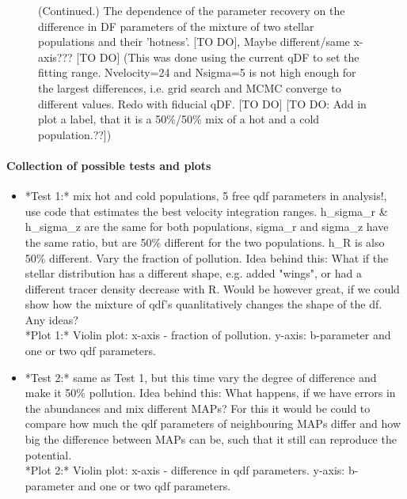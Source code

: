 \addtocounter{figure}{-1}
\begin{figure} [t!]
  \caption{(Continued.) The dependence of the parameter recovery on the difference in DF parameters of the mixture of two stellar populations and their 'hotness'.  [TO DO], Maybe different/same x-axis??? [TO DO] (This was done using the current qDF to set the fitting range. Nvelocity=24 and Nsigma=5 is not high enough for the largest differences, i.e. grid search and MCMC converge to different values. Redo with fiducial qDF. [TO DO] [TO DO: Add in plot a label, that it is a 50\%/50\% mix of a hot and a cold population.??])} 
\end{figure}


\paragraph{Collection of possible tests and plots}

\begin{itemize}
\item *Test 1:* mix hot and cold populations, 5 free qdf parameters in analysis!, use code that estimates the best velocity integration ranges. h\_sigma\_r \& h\_sigma\_z are the same for both populations, sigma\_r and sigma\_z have the same ratio, but are 50\% different for the two populations. h\_R is also 50\% different. Vary the fraction of pollution. Idea behind this: What if the stellar distribution has a different shape, e.g. added "wings", or had a different tracer density decrease with R. Would be however great, if we could show how the mixture of qdf's quanlitatively changes the shape of the df. Any ideas? \\
*Plot 1:* Violin plot: x-axis - fraction of pollution. y-axis: b-parameter and one or two qdf parameters.
\item *Test 2:* same as Test 1, but this time vary the degree of difference and make it 50\% pollution. Idea behind this: What happens, if we have errors in the abundances and mix different MAPs? For this it would be could to compare how much the qdf parameters of neighbouring MAPs differ and how big the difference between MAPs can be, such that it still can reproduce the potential. \\
*Plot 2:* Violin plot: x-axis - difference in qdf parameters. y-axis: b-parameter and one or two qdf parameters.
\end{itemize}
